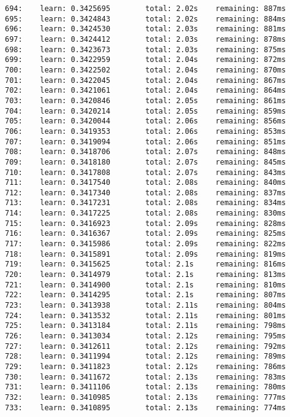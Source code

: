 \documentclass[11pt]{article}
\begin{document}
\begin{Verbatim}[commandchars=\\\{\}]
694:    learn: 0.3425695        total: 2.02s    remaining: 887ms
695:    learn: 0.3424843        total: 2.02s    remaining: 884ms
696:    learn: 0.3424530        total: 2.03s    remaining: 881ms
697:    learn: 0.3424412        total: 2.03s    remaining: 878ms
698:    learn: 0.3423673        total: 2.03s    remaining: 875ms
699:    learn: 0.3422959        total: 2.04s    remaining: 872ms
700:    learn: 0.3422502        total: 2.04s    remaining: 870ms
701:    learn: 0.3422045        total: 2.04s    remaining: 867ms
702:    learn: 0.3421061        total: 2.04s    remaining: 864ms
703:    learn: 0.3420846        total: 2.05s    remaining: 861ms
704:    learn: 0.3420214        total: 2.05s    remaining: 859ms
705:    learn: 0.3420044        total: 2.06s    remaining: 856ms
706:    learn: 0.3419353        total: 2.06s    remaining: 853ms
707:    learn: 0.3419094        total: 2.06s    remaining: 851ms
708:    learn: 0.3418706        total: 2.07s    remaining: 848ms
709:    learn: 0.3418180        total: 2.07s    remaining: 845ms
710:    learn: 0.3417808        total: 2.07s    remaining: 843ms
711:    learn: 0.3417540        total: 2.08s    remaining: 840ms
712:    learn: 0.3417340        total: 2.08s    remaining: 837ms
713:    learn: 0.3417231        total: 2.08s    remaining: 834ms
714:    learn: 0.3417225        total: 2.08s    remaining: 830ms
715:    learn: 0.3416923        total: 2.09s    remaining: 828ms
716:    learn: 0.3416367        total: 2.09s    remaining: 825ms
717:    learn: 0.3415986        total: 2.09s    remaining: 822ms
718:    learn: 0.3415891        total: 2.09s    remaining: 819ms
719:    learn: 0.3415625        total: 2.1s     remaining: 816ms
720:    learn: 0.3414979        total: 2.1s     remaining: 813ms
721:    learn: 0.3414900        total: 2.1s     remaining: 810ms
722:    learn: 0.3414295        total: 2.1s     remaining: 807ms
723:    learn: 0.3413938        total: 2.11s    remaining: 804ms
724:    learn: 0.3413532        total: 2.11s    remaining: 801ms
725:    learn: 0.3413184        total: 2.11s    remaining: 798ms
726:    learn: 0.3413034        total: 2.12s    remaining: 795ms
727:    learn: 0.3412611        total: 2.12s    remaining: 792ms
728:    learn: 0.3411994        total: 2.12s    remaining: 789ms
729:    learn: 0.3411823        total: 2.12s    remaining: 786ms
730:    learn: 0.3411672        total: 2.13s    remaining: 783ms
731:    learn: 0.3411106        total: 2.13s    remaining: 780ms
732:    learn: 0.3410985        total: 2.13s    remaining: 777ms
733:    learn: 0.3410895        total: 2.13s    remaining: 774ms

\end{Verbatim}
\end{document}
